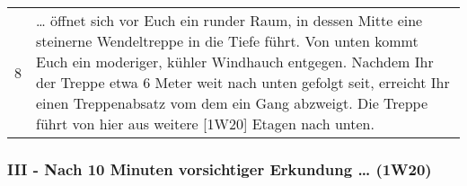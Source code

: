 \begin{tabularx}{\columnwidth}{cZ}
8 & \ldots{} öffnet sich vor Euch ein runder Raum, in dessen Mitte
eine steinerne Wendeltreppe in die Tiefe führt. Von unten kommt Euch
ein moderiger, kühler Windhauch entgegen. Nachdem Ihr der Treppe
etwa 6 Meter weit nach unten gefolgt seit, erreicht Ihr einen
Treppenabsatz vom dem ein Gang abzweigt. Die Treppe führt von hier
aus weitere [1W20] Etagen nach unten.\\

\end{tabularx}

\subsubsection{III - Nach 10 Minuten vorsichtiger Erkundung \ldots{} (1W20)}


